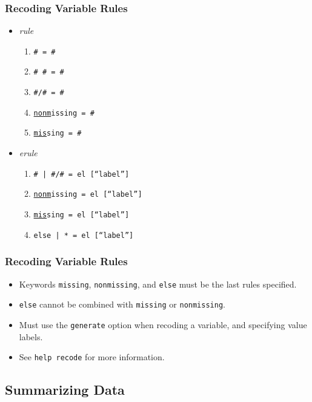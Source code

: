\documentclass{beamer}
\begin{document}
\begin{frame}
	\frametitle{Recoding Variable Rules}
		\begin{itemize}
			\item \textit{rule}
				\begin{enumerate}
					\item \texttt{\# = \#}
					\item \texttt{\# \# = \#}
					\item \texttt{\#/\# = \#}
					\item \texttt{\underline{nonm}issing = \#}
					\item \texttt{\underline{mis}sing = \#}
				\end{enumerate}
			\item \textit{erule}
				\begin{enumerate}
					\item \texttt{\# | \#/\# = el [``label'']}
					\item \texttt{\underline{nonm}issing = el [``label'']}
					\item \texttt{\underline{mis}sing = el [``label'']}
					\item \texttt{else | * = el [``label'']}
				\end{enumerate}
		\end{itemize}
\end{frame}

\begin{frame}
	\frametitle{Recoding Variable Rules}
		\begin{itemize}
			\item Keywords \texttt{missing}, \texttt{nonmissing}, and \texttt{else} must be the last rules specified.
			\item \texttt{else} cannot be combined with \texttt{missing} or \texttt{nonmissing}.
			\item Must use the \texttt{generate} option when recoding a variable, and specifying value labels.
			\item See \texttt{help recode} for more information.
		\end{itemize}
\end{frame}

\subsection{Summarizing Data}
\end{document}
